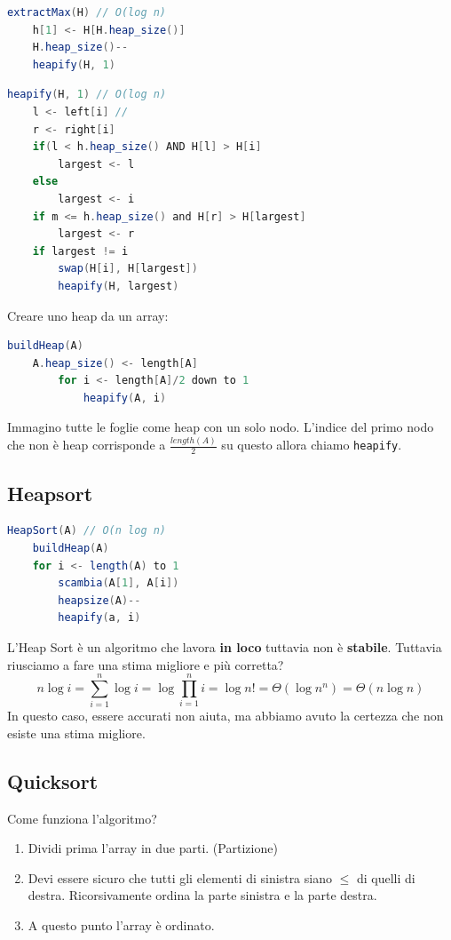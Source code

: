 \documentclass[a4paper]{article}
\begin{document}
\begin{lstlisting}[language=Scala]
extractMax(H) // O(log n)
    h[1] <- H[H.heap_size()]
    H.heap_size()--
    heapify(H, 1)
\end{lstlisting}

\begin{lstlisting}[language=Scala]
heapify(H, 1) // O(log n)
    l <- left[i] //
    r <- right[i]
    if(l < h.heap_size() AND H[l] > H[i]
        largest <- l
    else
        largest <- i
    if m <= h.heap_size() and H[r] > H[largest]
        largest <- r
    if largest != i
        swap(H[i], H[largest])
        heapify(H, largest)
\end{lstlisting}
Creare uno heap da un array:
\begin{lstlisting}[language=Scala]
buildHeap(A)
    A.heap_size() <- length[A]
        for i <- length[A]/2 down to 1
            heapify(A, i)
\end{lstlisting}
Immagino tutte le foglie come heap con un solo nodo. L'indice del primo nodo che non è heap corrisponde a $\frac{length(A)}{2}$ su questo allora chiamo \texttt{heapify}.

\pagebreak

\subsection{Heapsort}
\begin{lstlisting}[language=Scala]
HeapSort(A) // O(n log n)
    buildHeap(A)
    for i <- length(A) to 1
        scambia(A[1], A[i])
        heapsize(A)--
        heapify(a, i)
\end{lstlisting}
L'Heap Sort è un algoritmo che lavora \textbf{in loco} tuttavia non è \textbf{stabile}. Tuttavia riusciamo a fare una stima migliore e più corretta?
\[n \log i = \sum_{i=1}^n \log i = \log \prod_{i=1}^n i = \log n! = \Theta(\log n^n) = \Theta(n \log n)\]
In questo caso, essere accurati non aiuta, ma abbiamo avuto la certezza che non esiste una stima migliore.
\subsection{Quicksort}
Come funziona l'algoritmo?
\begin{enumerate}
    \item Dividi prima l'array in due parti. (Partizione)
    \item  Devi essere sicuro che tutti gli elementi di sinistra siano $\le$ di quelli di destra. Ricorsivamente ordina la parte sinistra e la parte destra.
    \item A questo punto l'array è ordinato.
\end{enumerate}
\end{document}
